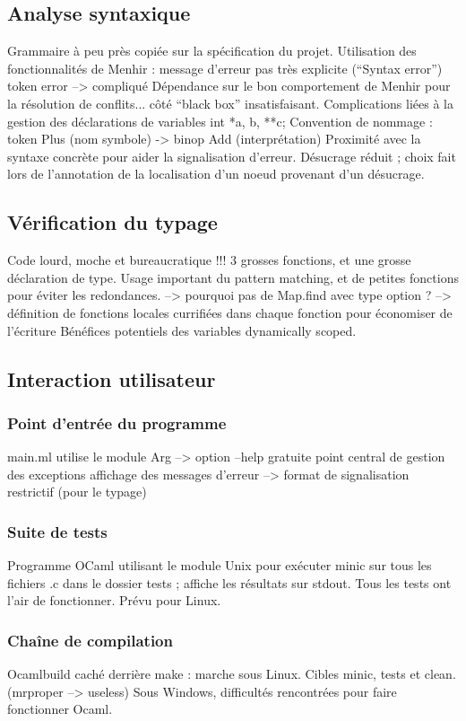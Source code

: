 \documentclass[a4paper, 11pt]{article}
\begin{document}
\subsection{Analyse syntaxique}

Grammaire à peu près copiée sur la spécification du projet.
Utilisation des fonctionnalités de Menhir :
message d'erreur pas très explicite (``Syntax error'')
token error --> compliqué
Dépendance sur le bon comportement de Menhir pour la résolution de conflits...
côté ``black box'' insatisfaisant.
Complications liées à la gestion des déclarations de variables
int *a, b, **c;
Convention de nommage : token Plus (nom symbole) -> binop Add (interprétation)
Proximité avec la syntaxe concrète pour aider la signalisation d'erreur.
Désucrage réduit ; choix fait lors de l'annotation de la localisation
d'un noeud provenant d'un désucrage.

\subsection{Vérification du typage}

Code lourd, moche et bureaucratique !!!
3 grosses fonctions, et une grosse déclaration de type.
Usage important du pattern matching, et de petites fonctions pour éviter les redondances.
--> pourquoi pas de Map.find avec type option ?
--> définition de fonctions locales currifiées dans chaque fonction pour
  économiser de l'écriture
Bénéfices potentiels des variables dynamically scoped.

\subsection{Interaction utilisateur}

\subsubsection{Point d'entrée du programme}

main.ml
utilise le module Arg --> option --help gratuite
point central de gestion des exceptions
affichage des messages d'erreur
--> format de signalisation restrictif (pour le typage)

\subsubsection{Suite de tests}

Programme OCaml utilisant le module Unix pour exécuter minic sur tous les fichiers .c
dans le dossier tests ; affiche les résultats sur stdout.
Tous les tests ont l'air de fonctionner.
Prévu pour Linux.

\subsubsection{Chaîne de compilation}

Ocamlbuild caché derrière make : marche sous Linux.
Cibles minic, tests et clean. (mrproper --> useless)
Sous Windows, difficultés rencontrées pour faire fonctionner Ocaml.
\end{document}
